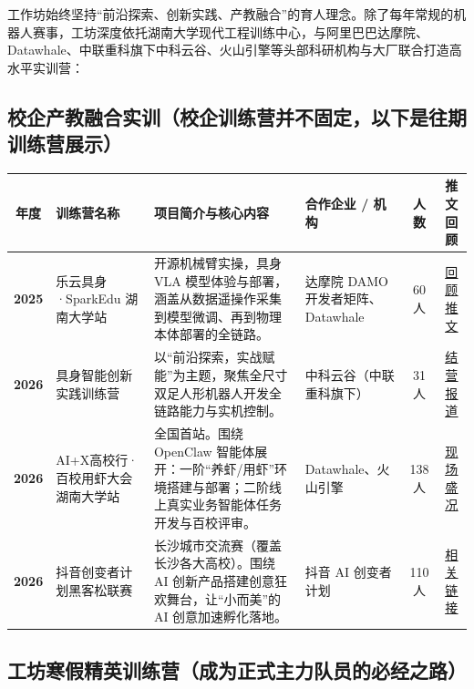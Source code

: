 \documentclass[a4paper,11pt,oneside]{scrreprt}
\begin{document}
工作坊始终坚持“前沿探索、创新实践、产教融合”的育人理念。除了每年常规的机器人赛事，工坊深度依托湖南大学现代工程训练中心，与阿里巴巴达摩院、Datawhale、中联重科旗下中科云谷、火山引擎等头部科研机构与大厂联合打造高水平实训营：

\subsection{校企产教融合实训（校企训练营并不固定，以下是往期训练营展示）}

\begin{center}
\small
\renewcommand{\arraystretch}{1.35}
\setlength{\tabcolsep}{4pt}
\begin{tabularx}{\textwidth}{@{} c >{\raggedright\arraybackslash}p{3.0cm} >{\raggedright\arraybackslash}X >{\raggedright\arraybackslash}p{2.6cm} c c @{}}
\toprule
\textbf{年度} & \textbf{训练营名称} & \textbf{项目简介与核心内容} & \textbf{合作企业 / 机构} & \textbf{人数} & \textbf{推文回顾} \\
\midrule
\textbf{2025} & 乐云具身·SparkEdu 湖南大学站 & 开源机械臂实操，具身 VLA 模型体验与部署，涵盖从数据遥操作采集到模型微调、再到物理本体部署的全链路。 & 达摩院 DAMO 开发者矩阵、Datawhale & 60 人 & \href{https://mp.weixin.qq.com/s/ihzD-yhNVHQPK1FejKWDNQ}{\underline{回顾推文}} \\
\midrule
\textbf{2026} & 具身智能创新实践训练营 & 以“前沿探索，实战赋能”为主题，聚焦全尺寸双足人形机器人开发全链路能力与实机控制。 & 中科云谷（中联重科旗下） & 31 人 & \href{https://mp.weixin.qq.com/s/E1cUX-PR-QRzz49iwjcRkg}{\underline{结营报道}} \\
\midrule
\textbf{2026} & AI+X高校行·百校用虾大会 湖南大学站 & 全国首站。围绕 OpenClaw 智能体展开：一阶“养虾/用虾”环境搭建与部署；二阶线上真实业务智能体任务开发与百校评审。 & Datawhale、火山引擎 & 138 人 & \href{https://mp.weixin.qq.com/s/jr7Jtku0GMDiRccZIJmcdg}{\underline{现场盛况}} \\
\midrule
\textbf{2026} & 抖音创变者计划黑客松联赛 & 长沙城市交流赛（覆盖长沙各大高校）。围绕 AI 创新产品搭建创意狂欢舞台，让“小而美”的 AI 创意加速孵化落地。 & 抖音 AI 创变者计划 & 110 人 & \href{https://mp.weixin.qq.com/s/maKGxujJ5bABPwvlARMFmg}{\underline{相关链接}} \\
\bottomrule
\end{tabularx}
\end{center}

\vspace{0.5cm}

\subsection{工坊寒假精英训练营（成为正式主力队员的必经之路）}
\end{document}
